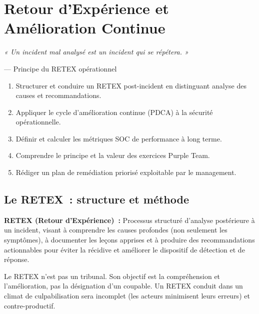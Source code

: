 \chapter{Retour d'Expérience et Amélioration Continue}
\label{chap:retex}

\epigraph{\itshape « Un incident mal analysé est un incident
  qui se répétera. »}
         {--- Principe du RETEX opérationnel}

\begin{boxobjectifs}
\begin{enumerate}
  \item Structurer et conduire un RETEX post-incident en distinguant
        analyse des causes et recommandations.
  \item Appliquer le cycle d'amélioration continue (PDCA) à la sécurité
        opérationnelle.
  \item Définir et calculer les métriques SOC de performance à long terme.
  \item Comprendre le principe et la valeur des exercices Purple Team.
  \item Rédiger un plan de remédiation priorisé exploitable par le management.
\end{enumerate}
\end{boxobjectifs}

\section{Le RETEX~: structure et méthode}
\label{sec:retex}

\begin{boxdef}
\textbf{RETEX (Retour d'Expérience)~:} Processus structuré d'analyse
postérieure à un incident, visant à comprendre les causes profondes
(non seulement les symptômes), à documenter les leçons apprises et à
produire des recommandations actionnables pour éviter la récidive et
améliorer le dispositif de détection et de réponse.
\end{boxdef}

Le RETEX n'est pas un tribunal. Son objectif est la compréhension et
l'amélioration, pas la désignation d'un coupable. Un RETEX conduit dans
un climat de culpabilisation sera incomplet (les acteurs minimisent leurs
erreurs) et contre-productif.

